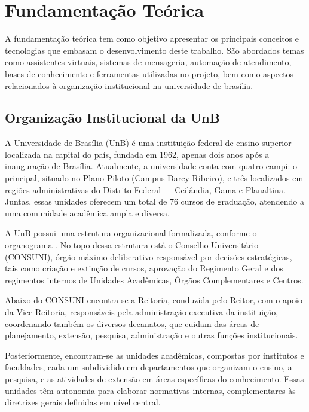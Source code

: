 \chapter[Fundamentação Teórica]{Fundamentação Teórica}

A fundamentação teórica tem como objetivo apresentar os principais conceitos e tecnologias que embasam o desenvolvimento deste trabalho. São abordados temas como assistentes virtuais, sistemas de mensageria, automação de atendimento, bases de conhecimento e ferramentas utilizadas no projeto, bem como aspectos relacionados à organização institucional na universidade de brasília.

\section{Organização Institucional da UnB}

A Universidade de Brasília (UnB) é uma instituição federal de ensino superior localizada na capital do país, fundada em 1962, apenas dois anos após a inauguração de Brasília. Atualmente, a universidade conta com quatro campi: o principal, situado no Plano Piloto (Campus Darcy Ribeiro), e três localizados em regiões administrativas do Distrito Federal — Ceilândia, Gama e Planaltina. Juntas, essas unidades oferecem um total de 76 cursos de graduação, atendendo a uma comunidade acadêmica ampla e diversa. 

A UnB possui uma estrutura organizacional formalizada, conforme o organograma \cite{organogramaUnB2017}. No topo dessa estrutura está o Conselho Universitário (CONSUNI), órgão máximo deliberativo responsável por decisões estratégicas, tais como criação e extinção de cursos, aprovação do Regimento Geral e dos regimentos internos de Unidades Acadêmicas, Órgãos Complementares e Centros.

Abaixo do CONSUNI encontra-se a Reitoria, conduzida pelo Reitor, com o apoio da Vice‑Reitoria, responsáveis pela administração executiva da instituição, coordenando também os diversos decanatos, que cuidam das áreas de planejamento, extensão, pesquisa, administração e outras funções institucionais.

Posteriormente, encontram-se as unidades acadêmicas, compostas por institutos e faculdades, cada um subdividido em departamentos que organizam o ensino, a pesquisa, e as atividades de extensão em áreas específicas do conhecimento. Essas unidades têm autonomia para elaborar normativas internas, complementares às diretrizes gerais definidas em nível central.

